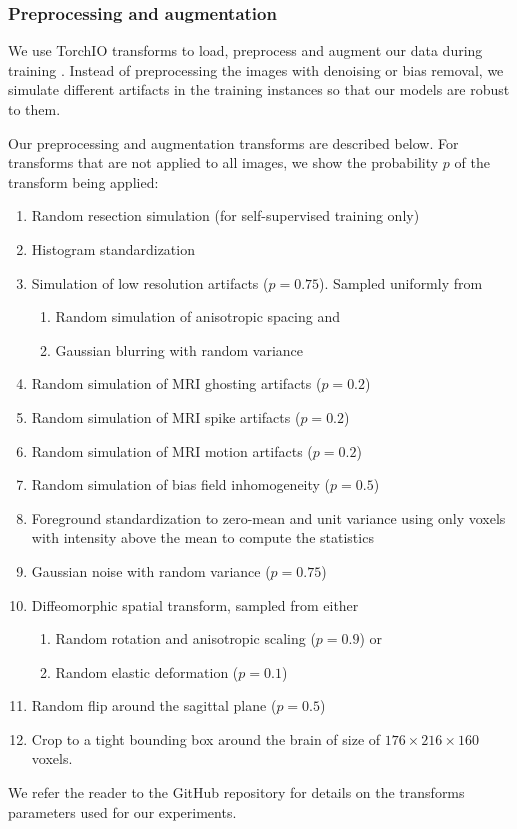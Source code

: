 \subsubsection{Preprocessing and augmentation}
\label{sec:preprocessing_augmentation}

We use TorchIO transforms to load, preprocess and augment our data during training \cite{perez-garcia_torchio_2021}.
Instead of preprocessing the images with denoising or bias removal, we simulate different artifacts in the training instances so that our models are robust to them.

Our preprocessing and augmentation transforms are described below.
For transforms that are not applied to all images, we show the probability $p$ of the transform being applied:

\begin{enumerate}
    \item Random resection simulation (for self-supervised training only)
    \item Histogram standardization \cite{nyul_new_2000}
    \item Simulation of low resolution artifacts ($p = 0.75$). Sampled uniformly from
    \begin{enumerate}
        \item Random simulation of anisotropic spacing \cite{billot_partial_2020} and
        \item Gaussian blurring with random variance
    \end{enumerate}
    \item Random simulation of MRI ghosting artifacts \cite{shaw_heteroscedastic_2020} ($p = 0.2$)
    \item Random simulation of MRI spike artifacts \cite{shaw_heteroscedastic_2020} ($p = 0.2$)
    \item Random simulation of MRI motion artifacts \cite{shaw_mri_2019} ($p = 0.2$)
    \item Random simulation of bias field inhomogeneity \cite{sudre_longitudinal_2017} ($p = 0.5$)
    \item Foreground standardization to zero-mean and unit variance using only voxels with intensity above the mean to compute the statistics
    \item Gaussian noise with random variance ($p = 0.75$)
    \item Diffeomorphic spatial transform, sampled from either
    \begin{enumerate}
        \item Random rotation and anisotropic scaling ($p = 0.9$) or
        \item Random elastic deformation ($p = 0.1$)
    \end{enumerate}
    \item Random flip around the sagittal plane ($p = 0.5$)
    \item Crop to a tight bounding box around the brain of size of $176 \times 216 \times 160$ voxels.
\end{enumerate}

We refer the reader to the GitHub repository for details on the transforms parameters used for our experiments.

